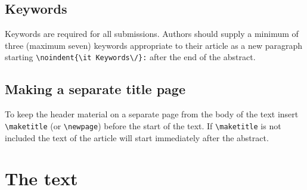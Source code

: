 \documentclass[12pt]{iopart}
\begin{document}
\subsection{Keywords}
Keywords are required for all submissions. Authors should supply a minimum of three (maximum seven) keywords appropriate to their article as a new paragraph starting \verb"\noindent{\it Keywords\/}:" after the end of the abstract.

\subsection{Making a separate title page}
To keep the header material on a separate page from the
body of the text insert \verb"\maketitle" (or \verb"\newpage") before the start of the text. 
If \verb"\maketitle" is not included the text of the
article will start immediately after the abstract.  

\section{The text}
\end{document}
